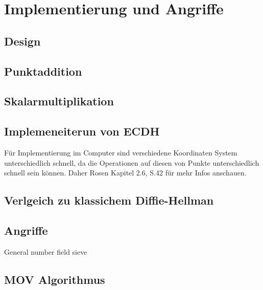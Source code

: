 \chapter{Implementierung und Angriffe}
\section{Design}
\section{Punktaddition}
\section{Skalarmultiplikation}
\section{Implemeneiterun von ECDH}

Für Implementierung im Computer sind verschiedene Koordinaten System unterschiedlich schnell, da die Operationen auf diesen von Punkte unterschiedlich schnell sein können. Daher Rosen Kapitel 2.6, S.42 für mehr Infos anschauen.
\section{Verlgeich zu klassichem Diffie-Hellman}

\section{Angriffe}
General number field sieve

\section{MOV Algorithmus}